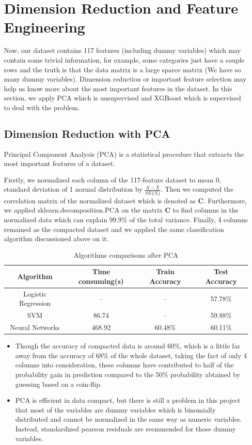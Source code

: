 \documentclass[a4paper,11pt,onecolumn,twoside]{article}
\begin{document}
\section{Dimension Reduction and Feature Engineering}
Now, our dataset contains 117 features (including dummy variables) which may contain some trivial information, for example, some categories just have a couple rows and the truth is that the data matrix is a large sparce matrix (We have so many dummy variables). Dimension reduction or important feature selection may help us know more about the most important features in the dataset. In this section, we apply PCA which is unsupervised and XGBoost which is supervised to deal with the problem. 
\subsection{Dimension Reduction with PCA}
Principal Component Analysis (PCA) is a statistical procedure that extracts the most important features of a dataset.\par
Firstly, we normalized each column of the 117-feature dataset to mean 0, standard deviation of 1 normal distribution by $\frac{X-\bar{X}}{SE\{X\}}$. Then we computed the correlation matrix of the normalized dataset which is denoted as $\bm{C}$. Furthermore, we applied sklearn.decomposition.PCA on the matrix $\bm{C}$ to find columns in the normalized data which can explain 99.9\% of the total variance. Finally, 4 columns remained as the compacted dataset and we applied the same classification algorithm discussioned above on it.
\begin{table}[H]
	\centering
	\begin{tabular}{cccc}
		\midrule[1.5pt]
		\textbf{Algorithm} &\textbf{Time consuming}(s)  &\textbf{Train Accuracy}&\textbf{Test Accuracy}\\
		\hline
		Logistic Regression&--&--&57.78\%\\
		SVM  &86.74&--&59.88\%\\
		Neural Networks&468.92&60.48\%&60.11\%\\
		\midrule[1.5pt]
	\end{tabular}
	\caption{Algorithms comparisons after PCA}
\end{table}
\begin{itemize}
	\item Though the accuracy of compacted data is around 60\%, which is a little far away from the accuracy of 68\% of the whole dataset, taking the fact of only 4 columns into consideration, these columns have contributed to half of the probability gain in prediction compared to the 50\% probability abtained by guessing based on a coin-flip. 
	\item PCA is efficient in data compact, but there is still a problem in this project that most of the variables are dummy variables which is binomially distributed and cannot be normalized in the same way as numeric variables. Instead, standardized pearson residuals are recmmended for those dummy variables.
\end{itemize}
\end{document}
